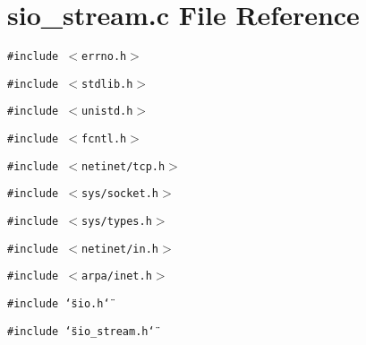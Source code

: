 \section{sio\_\-stream.c File Reference}
\label{sio__stream_8c}
{\tt \#include $<$errno.h$>$}\par
{\tt \#include $<$stdlib.h$>$}\par
{\tt \#include $<$unistd.h$>$}\par
{\tt \#include $<$fcntl.h$>$}\par
{\tt \#include $<$netinet/tcp.h$>$}\par
{\tt \#include $<$sys/socket.h$>$}\par
{\tt \#include $<$sys/types.h$>$}\par
{\tt \#include $<$netinet/in.h$>$}\par
{\tt \#include $<$arpa/inet.h$>$}\par
{\tt \#include \char`\"{}sio.h\char`\"{}}\par
{\tt \#include \char`\"{}sio\_\-stream.h\char`\"{}}\par
